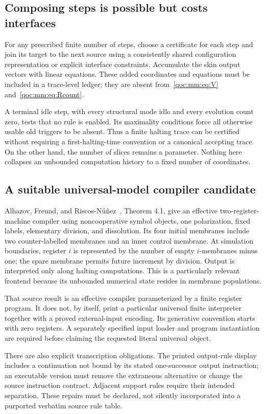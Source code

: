 \documentclass[11pt,letterpaper]{article}
\theoremstyle{definition}
\theoremstyle{remark}
\begin{document}
\subsection{Composing steps is possible but costs interfaces}
For any prescribed finite number of steps, choose a certificate for each step and join its target to the next source using a consistently shared configuration representation or explicit interface constraints. Accumulate the skin output vectors with linear equations. These added coordinates and equations must be included in a trace-level ledger; they are absent from~\eqref{qoc:mm:eq:V} and~\eqref{qoc:mm:eq:Rcount}.

A terminal idle step, with every structural mode idle and every evolution count zero, tests that no rule is enabled. Its maximality conditions force all otherwise usable old triggers to be absent. Thus a finite halting trace can be certified without requiring a first-halting-time convention or a canonical accepting trace. On the other hand, the number of slices remains a parameter. Nothing here collapses an unbounded computation history to a fixed number of coordinates.

\subsection{A suitable universal-model compiler candidate}
Alhazov, Freund, and Riscos-N\'u\~nez~\cite{mm:alhazov}, Theorem 4.1, give an effective two-register-machine compiler using noncooperative symbol objects, one polarization, fixed labels, elementary division, and dissolution. Its four initial membranes include two counter-labelled membranes and an inner control membrane. At simulation boundaries, register $i$ is represented by the number of empty $i$-membranes minus one; the spare membrane permits future increment by division. Output is interpreted only along halting computations. This is a particularly relevant frontend because its unbounded numerical state resides in membrane populations.

That source result is an effective compiler parameterized by a finite register program. It does not, by itself, print a particular universal finite interpreter together with a proved external-input encoding. Its generative convention starts with zero registers. A separately specified input loader and program instantiation are required before claiming the requested literal universal object.

There are also explicit transcription obligations. The printed output-rule display includes a continuation not bound by its stated one-successor output instruction; an executable version must remove the extraneous alternative or change the source instruction contract. Adjacent support rules require their intended separation. These repairs must be declared, not silently incorporated into a purported verbatim source rule table.
\end{document}
